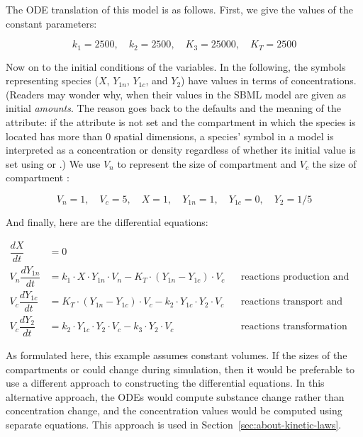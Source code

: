 
The ODE translation of this model is as follows.  First, we give
the values of the constant parameters:
\begin{linenomath}
\begin{equation*}
  k_1 = 2500, \quad k_2 = 2500, \quad K_3 = 25000, \quad K_T = 2500
\end{equation*}
\end{linenomath}
Now on to the initial conditions of the variables.  In the
following, the symbols representing species ($X$, $Y_{1n}$,
$Y_{1c}$, and $Y_2$) have values in terms of concentrations.
(Readers may wonder why, when their values in the SBML
model are given as initial \emph{amounts}.  The reason goes back
to the \Species defaults and the meaning of the
 attribute: if the attribute is not
set and the compartment in which the species is located has more
than 0 spatial dimensions, a species' symbol in a model is
interpreted as a concentration or density regardless of whether
its initial value is set using  or
.)  We use $V_n$ to represent the
size of compartment  and $V_c$ the
size of compartment :
\begin{linenomath}
\begin{equation*}
  V_n = 1, \quad V_c = 5, \quad X = 1, \quad Y_{1n} = 1, \quad Y_{1c} = 0, \quad Y_2 = 1/5
\end{equation*}
\end{linenomath}
And finally, here are the differential equations:
\begin{linenomath}
\begin{align*}
  \dfrac{d X}{d t}    &= 0 \\[6pt]
  V_n \dfrac{d Y_{1n}}{d t} &= k_1 \cdot X \cdot Y_{1n} \cdot V_n - K_T \cdot (Y_{1n} - Y_{1c}) \cdot V_c
    && \text{reactions production and transport} \\[6pt]
  V_c \dfrac{d Y_{1c}}{d t} &= K_T \cdot (Y_{1n} - Y_{1c}) \cdot V_c - k_2 \cdot Y_{1c} \cdot Y_2 \cdot V_c
    && \text{reactions transport and transformation} \\[6pt]
  V_c \dfrac{d Y_2}{d t}   &= k_2 \cdot Y_{1c} \cdot Y_2 \cdot V_c - k_3 \cdot Y_2 \cdot V_c
    && \text{reactions transformation and degradation}
\end{align*}
\end{linenomath}

As formulated here, this example assumes constant volumes.  If the
sizes of the compartments  or  could
change during simulation, then it would be preferable to use a
different approach to constructing the differential equations.  In
this alternative approach, the ODEs would compute substance change
rather than concentration change, and the concentration values
would be computed using separate equations.  This approach is used
in Section~\ref{sec:about-kinetic-laws}.


